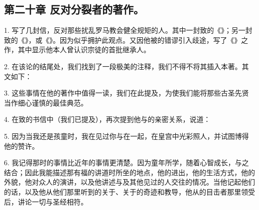 \subsection{第二十章 反对分裂者的著作。}

1. 写了几封信，反对那些扰乱罗马教会健全规矩的人。其中一封致的《》；另一封致的《》，或《》。因为似乎拥护此观点。又因他被的错谬引入歧途，写了《》之作，其中显示他本人曾认识宗徒的首批继承人。\par

2. 在该论的结尾处，我们找到了一段极美的注释，我们不得不将其插入本著。其文如下：\par

\par

3. 这些事情在他的著作中值得一读，我们在此提及，为使我们能将那些古圣先贤当作细心谨慎的最佳典范。\par

4. 在致的书信中（我们已提及），再次提到他与的亲密关系，说道：\par

\par

5. 因为当我还是孩童时，我在见过你与在一起，在皇宫中光彩照人，并试图博得他的赞许。\par

6. 我记得那时的事情比近年的事情更清楚。因为童年所学，随着心智成长，与之结合；因此我能描述那有福的讲道时所坐的地点，他的进出，他的生活方式，他的外貌，他对众人的演讲，以及他讲述与及其他见过的人交往的情况。当他记起他们的话，以及他从他们那里听到的关于、关于的奇迹和教导，他从的目击者那里领受后，\newline{}讲论一切与圣经相符。\par

